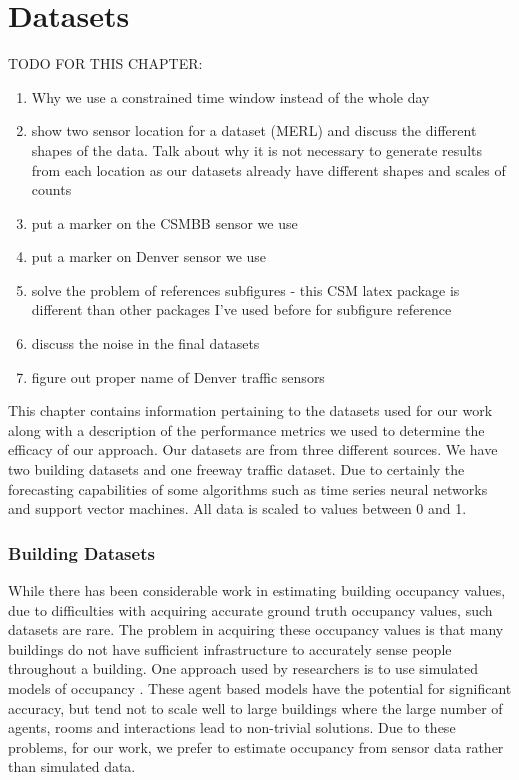 \chapter{Datasets}

TODO FOR THIS CHAPTER:
\begin{enumerate}
	\item Why we use a constrained time window instead of the whole day
	\item show two sensor location for a dataset (MERL) and discuss the different shapes of the data.  Talk about why it is not necessary to generate results from each location as our datasets already have different shapes and scales of counts
	\item put a marker on the CSMBB sensor we use
	\item put a marker on Denver sensor we use
	\item solve the problem of references subfigures - this CSM latex package is different than other packages I've used before for subfigure reference
	\item discuss the noise in the final datasets
	\item figure out proper name of Denver traffic sensors
\end{enumerate}

This chapter contains information pertaining to the datasets used for our work along with a description of the performance metrics  we used to determine the efficacy of our approach.  Our datasets are from three different sources.  We have two building datasets and one freeway traffic dataset.  Due to certainly the forecasting capabilities of some algorithms such as time series neural networks and support vector machines.  All data is scaled to values between 0 and 1.

\subsection{Building Datasets}
While there has been considerable work in estimating building occupancy values, due to difficulties with acquiring accurate ground truth occupancy values, such datasets are rare.  The problem in acquiring these occupancy values is that many buildings do not have sufficient infrastructure to accurately sense people throughout a building.  One approach used by researchers is to use simulated models of occupancy \cite{page2008, goldstein2010}.  These agent based models have the potential for significant accuracy, but tend not to scale well to large buildings where the large number of agents, rooms and interactions lead to non-trivial solutions.  Due to these problems, for our work, we prefer to estimate occupancy from sensor data rather than simulated data.

